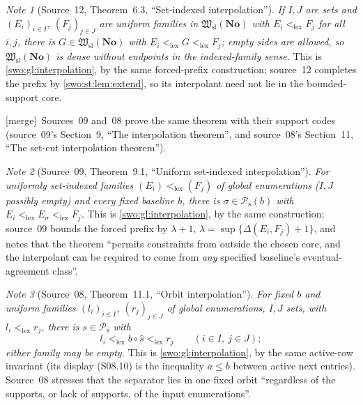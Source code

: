 \documentclass[11pt]{article}
\theoremstyle{definition}
\theoremstyle{remark}
\newtheorem{note}[note]{Note}
\newcommand{\No}{\mathbf{No}}
\newcommand{\Hsl}{\mathfrak W_{\mathrm{sl}}}
\newcommand{\Psupp}{\mathcal P_{\mathrm{s}}}
\newcommand{\lex}{\mathrm{lex}}
\newcommand{\merge}{\textsf{[merge]}}
\begin{document}

\begin{note}[Source~12, Theorem~6.3, ``Set-indexed interpolation'']\label{swo:st:thm:etasl}
\emph{If $I,J$ are sets and $(E_i)_{i\in I}$, $(F_j)_{j\in J}$ are uniform
families in $\Hsl(\No)$ with $E_i<_\lex F_j$ for all $i,j$, there is
$G\in\Hsl(\No)$ with $E_i<_\lex G<_\lex F_j$; empty sides are allowed, so
$\Hsl(\No)$ is dense without endpoints in the indexed-family sense.} This is
\cref{swo:gl:interpolation}, by the same forced-prefix construction; source~12
completes the prefix by \cref{swo:st:lem:extend}, so its interpolant need not
lie in the bounded-support core.
\end{note}


\merge\ Sources~09 and~08 prove the same theorem with their support codes
(source~09's Section~9, ``The interpolation theorem''\label{swo:ec:sec:interpolation},
and source~08's Section~11, ``The set-cut interpolation
theorem''\label{swo:sk:sec:interpolation}).

\begin{note}[Source~09, Theorem~9.1, ``Uniform set-indexed interpolation'']\label{swo:ec:thm:interpolation}
\emph{For uniformly set-indexed families $(E_i)<_\lex(F_j)$ of global
enumerations ($I,J$ possibly empty) and every fixed baseline $b$, there is
$\sigma\in\Psupp(b)$ with $E_i<_\lex E_\sigma<_\lex F_j$.} This is
\cref{swo:gl:interpolation}, by the same construction; source~09 bounds the
forced prefix by $\lambda+1$, $\lambda=\sup\{\Delta(E_i,F_j)+1\}$, and notes
that the theorem ``permits constraints from outside the chosen core, and the
interpolant can be required to come from \emph{any} specified baseline's
eventual-agreement class''.
\end{note}

\begin{note}[Source~08, Theorem~11.1, ``Orbit interpolation'']\label{swo:sk:thm:orbitcut}
\emph{For fixed $b$ and uniform families $(l_i)_{i\in I}$, $(r_j)_{j\in J}$ of
global enumerations, $I,J$ sets, with $l_i<_\lex r_j$, there is $s\in\Psupp$
with}
\[
 l_i<_{\lex}b\circ\widehat s<_{\lex}r_j\qquad(i\in I,\ j\in J);
 \tag{S08.9}\label{swo:sk:eq:t9}
\]
\emph{either family may be empty.} This is \cref{swo:gl:interpolation}, by the
same active-row invariant (its display (S08.10) is the inequality $a\le b$
between active next entries). Source~08 stresses that the separator lies in
one fixed orbit ``regardless of the supports, or lack of supports, of the
input enumerations''.
\end{note}
\end{document}
